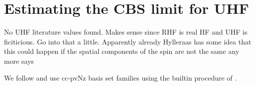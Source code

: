 \chapter{Estimating the CBS limit for UHF}
\label{apx:CbsLimit}
No UHF literature values found.
Makes sense since RHF is real HF and UHF is ficiticious.
Go into that a little.
Apparently already Hylleraas\cite{Hylleraas1929} has some idea that this could
happen if the spatial components of the spin are not the same any more
says \cite{Mestechkin1981}


We follow \cite{Jensen2005} and use cc-pvNz basis set families
using the builtin procedure of \molsturm.
